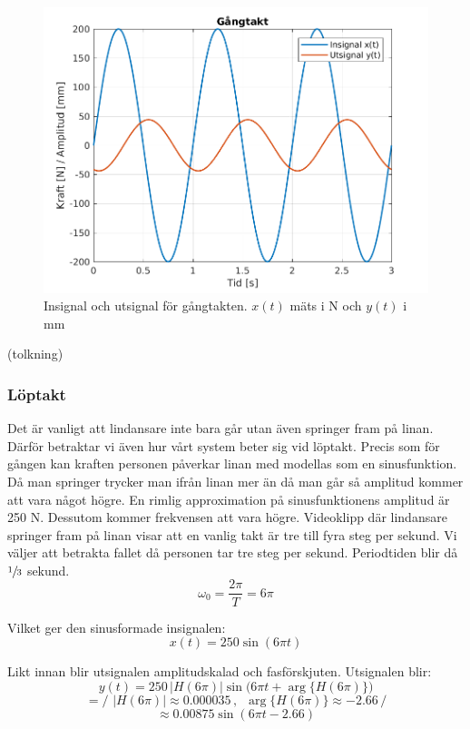 \begin{figure}[H]
    \centering
     \includegraphics[scale=0.9]{bilder/sinusfunktion_gangtakt}
    \caption{Insignal och utsignal för gångtakten. $x(t)$ mäts i N och $y(t)$ i mm}
    \label{fig:sinusfunktion_gangtakt}
\end{figure}
(tolkning)

\newpage
\subsubsection{Löptakt}
Det är vanligt att lindansare inte bara går utan även springer fram på linan. Därför betraktar vi även hur vårt system beter sig vid löptakt. Precis som för gången kan kraften personen påverkar linan med modellas som en sinusfunktion. Då man springer trycker man ifrån linan mer än då man går så amplitud kommer att vara något högre. En rimlig approximation på sinusfunktionens amplitud är 250 N. Dessutom kommer frekvensen att vara högre. Videoklipp där lindansare springer fram på linan visar att en vanlig takt är tre till fyra steg per sekund. Vi väljer att betrakta fallet då personen tar tre steg per sekund. Periodtiden blir då $\sfrac{1}{3}$ sekund.
$$\omega_0 = \dfrac{2\pi}{T} = 6\pi$$

Vilket ger den sinusformade insignalen:
$$x(t) = 250\sin(6\pi t)$$

Likt innan blir utsignalen amplitudskalad och fasförskjuten. Utsignalen blir:
$$y(t)=250\,\big|H(6\pi)\big|\sin\big(6\pi t+\arg\big\{H(6\pi)\big\}\big)$$
$$=\bigg/ \,\,\big|H(6\pi)\big|\approx 0.000035 \,,\,\,\, \arg\big\{H(6\pi)\big\}\approx -2.66  \,\bigg/$$
$$\approx 0.00875\sin(6\pi t - 2.66)$$


